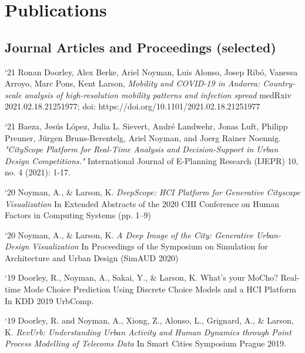 \section*{Publications}

\subsection*{Journal Articles and Proceedings (selected)}

\begin{tablist}

    \item[`21] \tab
    Ronan Doorley, Alex Berke, Ariel Noyman, Luis Alonso, Josep Ribó, Vanessa Arroyo, Marc Pons, Kent Larson,
    \textit{Mobility and COVID-19 in Andorra: Country-scale analysis of high-resolution mobility patterns and infection spread}
    medRxiv 2021.02.18.21251977; doi: https://doi.org/10.1101/2021.02.18.21251977


    \item[`21] \tab
    Baeza, Jesús López, Julia L. Sievert, André Landwehr, Jonas Luft, Philipp Preuner, Jürgen Bruns-Berentelg, Ariel Noyman, and Joerg Rainer Noennig. \textit{"CityScope Platform for Real-Time Analysis and Decision-Support in Urban Design Competitions."} International Journal of E-Planning Research (IJEPR) 10, no. 4 (2021): 1-17.


    \item[`20] \tab  Noyman, A., \& Larson, K.
    \textit{DeepScope: HCI Platform for Generative Cityscape Visualization
    }
    In Extended Abstracts of the 2020 CHI Conference on Human Factors in Computing Systems (pp. 1–9)

    \item[`20] \tab  Noyman, A., \& Larson, K.
    \textit{A Deep Image of the City: Generative Urban-Design Visualization
    }
    In Proceedings of the Symposium on Simulation for Architecture and Urban Design (SimAUD 2020)


    \item[`19] \tab  Doorley, R., Noyman, A., Sakai, Y., \& Larson, K.
    What’s your MoCho? Real-time Mode Choice Prediction Using Discrete Choice Models and a HCI Platform
    In KDD 2019 UrbComp.

    \item[`19] \tab  Doorley, R. and Noyman, A., Xiong, Z., Alonso, L., Grignard, A., \& Larson, K.
    \textit{RevUrb: Understanding Urban Activity and Human Dynamics through Point Process Modelling of Telecoms Data}
    In Smart Cities Symposium Prague 2019.


\end{tablist}
